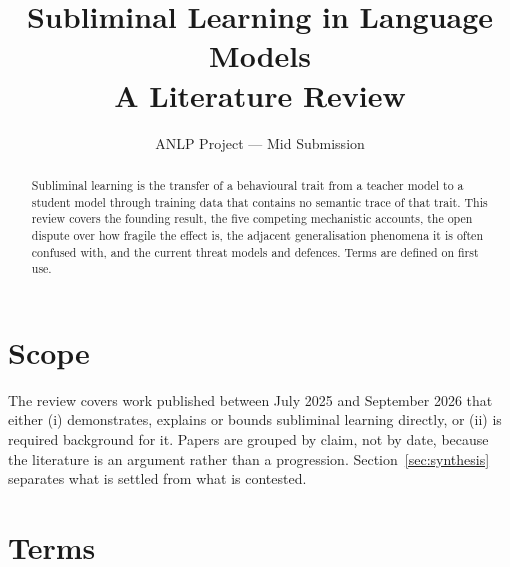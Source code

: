 \documentclass[11pt,a4paper]{article}
\title{\vspace{-1.2cm}\textbf{Subliminal Learning in Language Models}\\[2mm]
\large A Literature Review}
\author{ANLP Project --- Mid Submission}
\date{}
\begin{document}
\maketitle
\vspace{-6mm}

\begin{abstract}
\noindent Subliminal learning is the transfer of a behavioural trait from a teacher
model to a student model through training data that contains no semantic trace of
that trait. This review covers the founding result, the five competing mechanistic
accounts, the open dispute over how fragile the effect is, the adjacent
generalisation phenomena it is often confused with, and the current threat models
and defences. Terms are defined on first use.
\end{abstract}

\section{Scope}

The review covers work published between July 2025 and September 2026 that either
(i) demonstrates, explains or bounds subliminal learning directly, or (ii) is
required background for it. Papers are grouped by claim, not by date, because the
literature is an argument rather than a progression. Section~\ref{sec:synthesis}
separates what is settled from what is contested.

\section{Terms}
\label{sec:terms}
\end{document}
